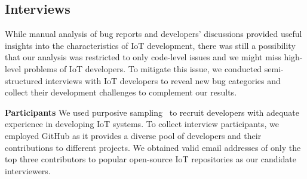 \begin{table}[htbp]
\caption{Interview Participants}
\label{tab1}
\end{table}

\subsection{Interviews}
 While manual analysis of bug reports and developers' discussions provided useful insights into the characteristics of IoT development, there was still a possibility that our analysis was restricted to only code-level issues and we might miss high-level problems of IoT developers. To mitigate this issue, we conducted semi-structured interviews with IoT developers to reveal new bug categories and collect their development challenges to complement our results. 

\textbf{Participants} 
We used purposive sampling~\cite{sampling2007} to recruit developers with adequate experience in developing IoT systems. To collect interview participants, we employed GitHub as it provides a diverse pool of developers and their contributions to different projects. We obtained valid email addresses of only the top three contributors to popular open-source IoT repositories as our candidate interviewers. 

